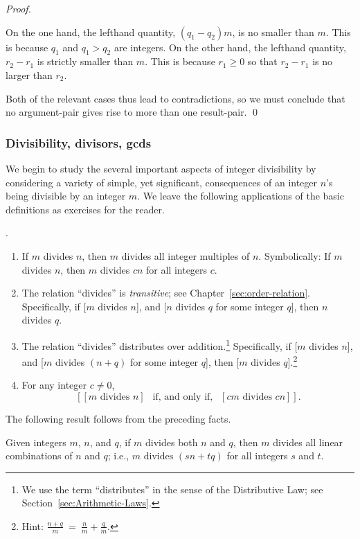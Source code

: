 \begin{proof}
\begin{itemize}
On the one hand, the lefthand quantity, $(q_1 - q_2) m$, is no smaller than $m$.  This is because $q_1$ and $q_1 > q_2$ are integers.  On the other hand, the lefthand quantity, $r_2 - r_1$ is strictly smaller than $m$.  This is because $r_1 \geq 0$ so that $r_2 - r_1$ is no larger than $r_2$.
\end{itemize}
Both of the relevant cases thus lead to contradictions, so we must conclude that no argument-pair gives rise to more than one result-pair.  \qed
\end{proof}


\subsubsection{Divisibility, divisors, {\sc gcd}s}
\label{sec:divisibility+GCD}

We begin to study the several important aspects of integer divisibility by considering a variety of simple, yet significant, consequences of an integer $n$'s being divisible by an integer $m$.  We leave the following applications of the basic definitions as exercises for the reader.

\begin{prop}.
\label{thm:basic-divisibility}
\begin{enumerate}
\item
If $m$ divides $n$, then $m$ divides all integer multiples of $n$. Symbolically: If $m$ divides $n$, then $m$ divides $cn$ for all integers $c$.
\item
The relation ``divides'' is {\em transitive}; see Chapter~\ref{sec:order-relation}.  Specifically, if [$m$ divides $n$], and [$n$ divides $q$ for some integer $q$], then $n$ divides $q$.
\item
The relation ``divides'' distributes over addition.\footnote{We use the term ``distributes'' in the sense of the Distributive Law; see Section~\ref{sec:Arithmetic-Laws}.}  Specifically, if [$m$ divides $n$], and [$m$ divides $(n+q)$ for some integer $q$], then [$m$ divides $q$].\footnote{Hint: $\displaystyle \frac{n+q}{m} \ =
  \ \frac{n}{m} + \frac{q}{m}$.}
\item 
For any integer $c \neq 0$,
\[ \left[[m \mbox{ divides } n] \ \ \mbox{ if, and only if, } \ \ [cm  \mbox{ divides } cn] \right]. \]
\end{enumerate}
\end{prop}

The following result follows from the preceding facts.

\begin{prop}
\label{thm:m-common-divisor-nq}
Given integers $m$, $n$, and $q$, if $m$ divides both $n$ and $q$,
then $m$ divides all linear combinations of $n$ and $q$; i.e.,
$m \mbox{ divides } (sn + tq)$ for all integers $s$ and $t$.
\end{prop}

